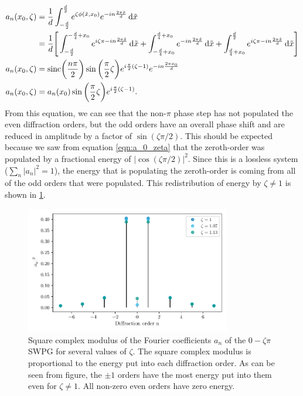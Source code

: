 \begin{equation}
\label{eqn:a_n_zeta}
	\begin{aligned}
	a_n(x_0,\zeta) &= \frac{1}{d}\int_{-\frac{d}{2}}^{\frac{d}{2}} e^{\zeta\phi(\tilde{x},x_0)}e^{-i n \frac{2\pi\tilde{x}}{d}}\mathop{}\!\mathrm{d}\tilde{x}\\
	&= \frac{1}{d}\Bigg[\int_{-\frac{d}{2}}^{-\frac{d}{4}+x_0}e^{i\zeta\pi-i n \frac{2\pi\tilde{x}}{d}} \mathop{}\!\mathrm{d}\tilde{x}
	+ \int_{-\frac{d}{4}+x_0}^{\frac{d}{4}+x_0}e^{-i n \frac{2\pi\tilde{x}}{d}} \mathop{}\!\mathrm{d}\tilde{x}
	+ \int_{\frac{d}{4}+x_0}^{\frac{d}{2}} e^{i\zeta\pi-i n \frac{2\pi\tilde{x}}{d}}\mathop{}\!\mathrm{d}\tilde{x} \Bigg]\\
	a_n(x_0, \zeta) & = \mathrm{sinc}\bigg(\frac{n\pi}{2}\bigg)\sin\bigg(\frac{\pi}{2}\zeta\bigg) e^{i\frac{\pi}{2} (\zeta - 1)} e^{-in\frac{2\pi x_0}{d}}\\
	a_n(x_0,\zeta) &= a_n(x_0)\sin\bigg(\frac{\pi}{2}\zeta\bigg)e^{i\frac{\pi}{2}(\zeta-1)}.
	\end{aligned}
\end{equation} 
From this equation, we can see that the non-$\pi$ phase step has not populated the even diffraction orders, but the odd orders have an overall phase shift and are reduced in amplitude by a factor of $\sin(\zeta\pi/2)$.  This should be expected because we saw from equation \ref{eqn:a_0_zeta} that the zeroth-order was populated by a fractional energy of $\rvert \cos(\zeta\pi/2)\rvert^2$.  Since this is a lossless system ($\sum_{n}\rvert a_n\rvert^2 = 1$), the energy that is populating the zeroth-order is coming from all of the odd orders that were populated. This redistribution of energy by $\zeta\neq1$ is shown in \ref{fig:a_n_zeta}.

\begin{figure}
	\centering
	\includegraphics[width=0.8\textwidth]{figures/Two_source/a_n_zeta.pdf}
	\caption{Square complex modulus of the Fourier coefficients $a_n$ of the $0-\zeta\pi$ SWPG for several values of $\zeta$. The square complex modulus is proportional to the energy put into each diffraction order.  As can be seen from figure, the $\pm1$ orders have the most energy put into them even for $\zeta\neq 1$.  All non-zero even orders have zero energy.}
	\label{fig:a_n_zeta}
\end{figure}

